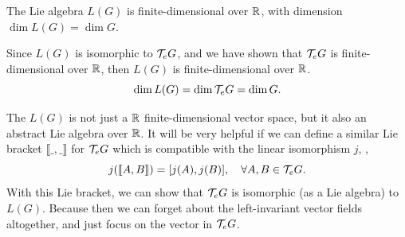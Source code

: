 \begin{corollary}
    The Lie algebra \(L(G)\) is finite-dimensional over \(\mathbb R\), with dimension \(\dim L(G) = \dim G\).
\end{corollary}
\begin{Proof}
    Since \(L(G)\) is isomorphic to \(\mathcal T_e G\), and we have shown that \(\mathcal T_e G\) is finite-dimensional over \(\mathbb R\), then \(L(G)\) is finite-dimensional over \(\mathbb R\).
    \begin{equation*}
        \dim L(G) = \dim \mathcal T_e G = \dim G.
    \end{equation*}
\end{Proof}

The \(L(G)\) is not just a \(\mathbb R\) finite-dimensional vector space, but it also an abstract Lie algebra over \(\mathbb R\). It will be very helpful if we can define a similar Lie bracket \(\llbracket \_, \_ \rrbracket\) for \(\mathcal T_e G\) which is compatible with the linear isomorphism \(j\), \ie,
\begin{equation*}
    j(\llbracket A, B \rrbracket) = [j(A), j(B)], \quad \forall A, B \in \mathcal T_e G.
\end{equation*}
With this Lie bracket, we can show that \(\mathcal T_e G\) is isomorphic (as a Lie algebra) to \(L(G)\). Because then we can forget about the left-invariant vector fields altogether, and just focus on the vector in \(\mathcal T_e G\).


